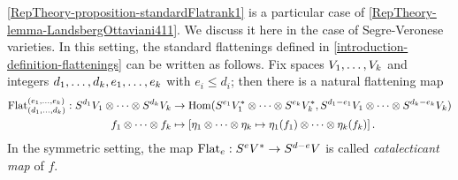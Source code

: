 \ref{RepTheory-proposition-standardFlatrank1} is a particular case of \ref{RepTheory-lemma-LandsbergOttaviani411}. We discuss it here in the case of Segre-Veronese varieties. In this setting, the standard flattenings defined in \ref{introduction-definition-flattenings} can be written as follows. Fix spaces $V_1 , \ldots , V_k$ and integers $d_1 , \ldots , d_k, e_1 , \ldots , e_k$ with $e_i \leq d_i$; then there is a natural flattening map
\[
\begin{aligned}
\mathrm{Flat}_{(d_1 , \ldots , d_k)}^{(e_1 , \ldots , e_k)} : S^{d_1} V_1 \otimes \cdots \otimes S^{d_k}V_k &\to \operatorname{Hom} ( S^{e_1} V_1^* \otimes \cdots \otimes S^{e_k}V_k^* , S^{d_1 - e_1} V_1 \otimes \cdots \otimes S^{d_k- e_k}V_k ) \\ 
f_1 \otimes \cdots \otimes f_k &\mapsto \left[ \eta_1 \otimes \cdots \otimes \eta_k \mapsto  \eta_1(f_1) \otimes \cdots \otimes \eta_k(f_k) \right] .
\end{aligned}
\]
In the symmetric setting, the map $\mathrm{Flat}_e : S^e V^* \to S^{d-e} V$ is called \emph{catalecticant map} of $f$.

